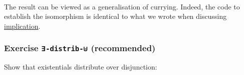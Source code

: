 \begin{fence}
\begin{code}
\AgdaSymbol{\}\}\}}\<%
\\
%
\>[4]\AgdaSymbol{;}\AgdaSpace{}%
\AgdaSpace{}%
\AgdaSymbol{=}%
\>[17]\AgdaSpace{}%
\AgdaSpace{}%
\AgdaSpace{}%
\AgdaSpace{}%
\AgdaSymbol{\}}\<%
\\
%
\>[4]\AgdaSymbol{;}\AgdaSpace{}%
\AgdaSpace{}%
\AgdaSymbol{=}%
\>[17]\AgdaSpace{}%
\AgdaSpace{}%
\AgdaSpace{}%
\AgdaSpace{}%
\AgdaSpace{}%
\AgdaSpace{}%
\AgdaSpace{}%
\AgdaOperator{\AgdaInductiveConstructor{,}}\AgdaSpace{}%
\AgdaSpace{}%
\AgdaSpace{}%
\AgdaSpace{}%
\AgdaSpace{}%
\AgdaSymbol{\}\}}\<%
\\
%
\>[4]\AgdaSymbol{\}}\<%
\end{code}
\end{fence}

The result can be viewed as a generalisation of currying. Indeed, the
code to establish the isomorphism is identical to what we wrote when
discussing \protect\hyperlink{Connectives-implication}{implication}.

\hypertarget{exercise--distrib--recommended-1}{%
\subsubsection{\texorpdfstring{Exercise \texttt{∃-distrib-⊎}
(recommended)}{Exercise ∃-distrib-⊎ (recommended)}}\label{exercise--distrib--recommended-1}}

Show that existentials distribute over disjunction:

